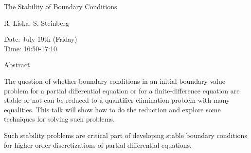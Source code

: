 \begin{center}
\LARGE
The Stability of Boundary Conditions 

\end{center}

\begin{center}
\Large
R. Liska, S. Steinberg

\end{center}

\noindent
Date:  July 19th (Friday)\\
Time: 16:50-17:10\\

\begin{center}
\large
Abstract
\end{center}

The question of whether boundary conditions in an initial-boundary value problem for a partial
differential equation or for a finite-difference equation are stable or not can be reduced to a
quantifier elimination problem with many equalities. This talk will show how to do the reduction
and explore some techniques for solving such problems. 

Such stability problems are critical part of developing stable boundary conditions for higher-order
discretizations of partial differential equations. 

